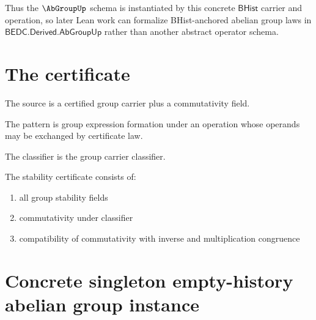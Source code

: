 Thus the $\AbGroupUp$ schema is instantiated by this concrete $\mathsf{BHist}$
carrier and operation, so later Lean work can formalize BHist-anchored abelian
group laws in $\mathsf{BEDC.Derived.AbGroupUp}$ rather than another abstract
operator schema.

\section{The certificate}

\begin{definition}
\label{def:abgroup-source-specification}
The source is a certified group carrier plus a commutativity field.
\end{definition}

\begin{definition}
\label{def:abgroup-pattern-specification}
The pattern is group expression formation under an operation whose operands may be exchanged by certificate law.
\end{definition}

\begin{definition}
\label{def:abgroup-classifier-specification}
The classifier is the group carrier classifier.
\end{definition}

\begin{definition}
\label{def:abgroup-stability-certificate}
The stability certificate consists of:
\begin{enumerate}
  \item all group stability fields
  \item commutativity under classifier
  \item compatibility of commutativity with inverse and multiplication congruence
\end{enumerate}
\end{definition}

\section{Concrete singleton empty-history abelian group instance}
\label{sec:abgroup-concrete-singleton-instance}

